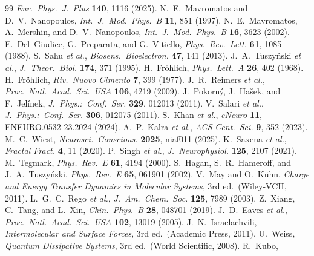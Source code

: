 \documentclass[twocolumn,10pt]{article}
\begin{document}
\begin{thebibliography}{99}
\textit{Eur.\ Phys.\ J.\ Plus} \textbf{140}, 1116 (2025).
 N.~E.~Mavromatos and D.~V.~Nanopoulos,
\textit{Int.\ J.\ Mod.\ Phys.\ B} \textbf{11}, 851 (1997).
 N.~E.~Mavromatos, A.~Mershin, and D.~V.~Nanopoulos,
\textit{Int.\ J.\ Mod.\ Phys.\ B} \textbf{16}, 3623 (2002).
 E.~Del~Giudice, G.~Preparata, and G.~Vitiello,
\textit{Phys.\ Rev.\ Lett.} \textbf{61}, 1085 (1988).
 S.~Sahu \textit{et al.},
\textit{Biosens.\ Bioelectron.} \textbf{47}, 141 (2013).
 J.~A.~Tuszy\'nski \textit{et al.},
\textit{J.\ Theor.\ Biol.} \textbf{174}, 371 (1995).
 H.~Fr\"ohlich,
\textit{Phys.\ Lett.\ A} \textbf{26}, 402 (1968).
 H.~Fr\"ohlich,
\textit{Riv.\ Nuovo Cimento} \textbf{7}, 399 (1977).
 J.~R.~Reimers \textit{et al.},
\textit{Proc.\ Natl.\ Acad.\ Sci.\ USA} \textbf{106}, 4219 (2009).
 J.~Pokorn\'y, J.~Ha\v{s}ek, and F.~Jel\'inek,
\textit{J.\ Phys.:\ Conf.\ Ser.} \textbf{329}, 012013 (2011).
 V.~Salari \textit{et al.},
\textit{J.\ Phys.:\ Conf.\ Ser.} \textbf{306}, 012075 (2011).
 S.~Khan \textit{et al.},
\textit{eNeuro} \textbf{11}, ENEURO.0532-23.2024 (2024).
 A.~P.~Kalra \textit{et al.},
\textit{ACS Cent.\ Sci.} \textbf{9}, 352 (2023).
 M.~C.~Wiest,
\textit{Neurosci.\ Conscious.} \textbf{2025}, niaf011 (2025).
 K.~Saxena \textit{et al.},
\textit{Fractal Fract.} \textbf{4}, 11 (2020).
 P.~Singh \textit{et al.},
\textit{J.\ Neurophysiol.} \textbf{125}, 2107 (2021).
 M.~Tegmark,
\textit{Phys.\ Rev.\ E} \textbf{61}, 4194 (2000).
 S.~Hagan, S.~R.~Hameroff, and J.~A.~Tuszy\'nski,
\textit{Phys.\ Rev.\ E} \textbf{65}, 061901 (2002).
 V.~May and O.~K\"uhn, \textit{Charge and Energy Transfer
Dynamics in Molecular Systems}, 3rd ed.\ (Wiley-VCH, 2011).
 L.~G.~C.~Rego \textit{et al.},
\textit{J.\ Am.\ Chem.\ Soc.} \textbf{125}, 7989 (2003).
 Z.~Xiang, C.~Tang, and L.~Xin,
\textit{Chin.\ Phys.\ B} \textbf{28}, 048701 (2019).
 J.~D.~Eaves \textit{et al.},
\textit{Proc.\ Natl.\ Acad.\ Sci.\ USA} \textbf{102}, 13019 (2005).
 J.~N.~Israelachvili, \textit{Intermolecular and
Surface Forces}, 3rd ed.\ (Academic Press, 2011).
 U.~Weiss, \textit{Quantum Dissipative Systems},
3rd ed.\ (World Scientific, 2008).
 R.~Kubo,

\end{thebibliography}
\end{document}
